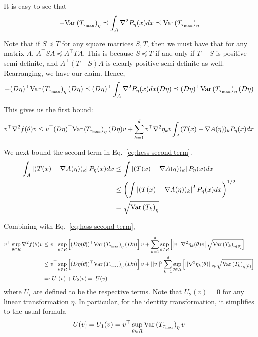 \documentclass[10pt]{article}
\begin{document}
It is easy to see that
\begin{align*}
    -\text{Var}\left(T_{\tau_{\max}}\right)_{\eta}
    \preceq
    \int_A \nabla^2 P_{\eta}(x) dx
    \preceq
    \text{Var}\left(T_{\tau_{\max}}\right)_{\eta}
\end{align*}

Note that if $S \preceq T$
for any square matrices $S, T$,
then we must have that for any matrix $A$,
$A^\top S A \preceq A^\top T A$.
This is because $S \preceq T$
if and only if $T - S$ is positive semi-definite,
and $A^\top (T-S) A$ is clearly positive semi-definite as well.
Rearranging, we have our claim.
Hence, 
\begin{align*}
    -(D\eta)^\top
    \text{Var}\left(T_{\tau_{\max}}\right)_{\eta}
    (D\eta)
    \preceq
    (D\eta)^\top
    \int_A \nabla^2 P_{\eta}(x) dx
    (D\eta)
    \preceq
    (D\eta)^\top
    \text{Var}\left(T_{\tau_{\max}}\right)_{\eta}
    (D\eta)
\end{align*}

This gives us the first bound:
\begin{align}
    v^\top \nabla^2 f(\theta) v
    \leq
    v^\top (D\eta)^\top \text{Var}\left(T_{\tau_{\max}}\right)_{\eta} (D\eta) v
    +
    \sum\limits_{k=1}^d 
    v^\top \nabla^2 \eta_k v
    \int_A (T(x) - \nabla A(\eta))_k P_\eta(x) dx
    \label{eq:hess-second-term}
\end{align}

We next bound the second term in Eq.~\ref{eq:hess-second-term}.
\begin{align*}
    \int_A \left\lvert(T(x) - \nabla A(\eta))_k\right\rvert P_\eta(x) dx
    &\leq
    \int \left\lvert(T(x) - \nabla A(\eta))_k\right\rvert P_\eta(x) dx
    \\&\leq
    \left(\int \left\lvert(T(x) - \nabla A(\eta))_k\right\rvert^2 P_\eta(x) dx\right)^{1/2}
    \\&=
    \sqrt{\text{Var}\left(T_k\right)_\eta}
\end{align*}

Combining with Eq.~\ref{eq:hess-second-term},
\begin{align*}
    v^\top \sup\limits_{\theta \in R} \nabla^2 f(\theta) v
    &\leq
    v^\top \sup\limits_{\theta \in R} \bracket{(D\eta(\theta))^\top \var{T_{\tau_{\max}}}_{\eta} (D\eta)} v
    +
    \sum\limits_{k=1}^d 
    \sup\limits_{\theta \in R}
    \bracket{%
        \abs{v^\top \nabla^2 \eta_k(\theta) v}
        \sqrt{\var{T_k}_{\eta(\theta)}}
    }
    \\&\leq
    v^\top \sup\limits_{\theta \in R} \bracket{(D\eta(\theta))^\top \var{T_{\tau_{\max}}}_{\eta} (D\eta)} v
    +
    \norm{v}^2
    \sum\limits_{k=1}^d 
    \sup\limits_{\theta \in R}
    \bracket{%
        \norm{\nabla^2 \eta_k(\theta)}_{op}
        \sqrt{\var{T_k}_{\eta(\theta)}}
    }
    \\&=: 
    U_1(v) + U_2(v)
    =:
    U(v)
\end{align*}
where $U_i$ are defined to be the respective terms.
Note that $U_2(v) = 0$ for any linear transformation $\eta$.
In particular, for the identity transformation, it simplifies to the usual formula
\begin{align*}
    U(v) = U_1(v) = v^\top \sup\limits_{\theta \in R} \text{Var}\left(T_{\tau_{\max}}\right)_\eta v
\end{align*}
\end{document}
